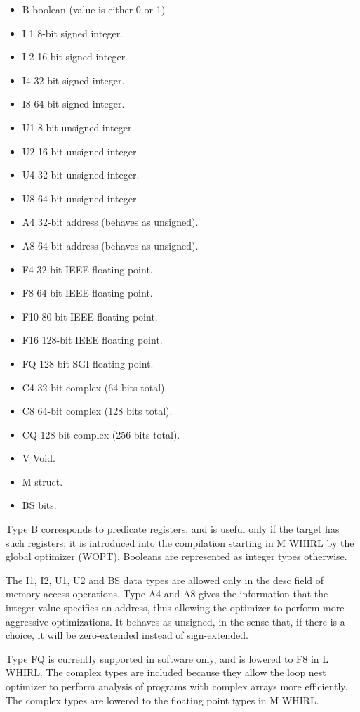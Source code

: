 \begin{itemize}
\item B boolean (value is either 0 or 1) 
\item I 1 8-bit signed integer. 
\item I 2 16-bit signed integer.
\item I4 32-bit signed integer. 
\item I8 64-bit signed integer.
\item U1 8-bit unsigned integer. 
\item U2 16-bit unsigned integer. 
\item U4 32-bit unsigned integer. 
\item U8 64-bit unsigned integer. 
\item A4 32-bit address (behaves as unsigned). 
\item A8 64-bit address (behaves as unsigned).
\item F4 32-bit IEEE floating point. 
\item F8 64-bit IEEE floating point. 
\item F10 80-bit IEEE floating point. 
\item F16 128-bit IEEE floating point.
\item FQ 128-bit SGI floating point.
\item C4 32-bit complex (64 bits total). 
\item C8 64-bit complex (128 bits total). 
\item CQ 128-bit complex (256 bits total).
\item V Void. 
\item M struct. 
\item BS bits.
\end{itemize}

Type B corresponds to predicate registers, and is useful only if
the target has such registers; it is introduced into the compilation
starting in M WHIRL by the global optimizer (WOPT). Booleans are
represented as integer types otherwise.

The I1, I2, U1, U2 and BS data types are allowed only in the desc
field of memory access operations. Type A4 and A8 gives the information
that the integer value specifies an address, thus allowing the
optimizer to perform more aggressive optimizations. It behaves as
unsigned, in the sense that, if there is a choice, it will be
zero-extended instead of sign-extended.

Type FQ is currently supported in software only, and is lowered to
F8 in L WHIRL. The complex types are included because they allow
the loop nest optimizer to perform analysis of programs with complex
arrays more efficiently. The complex types are lowered to the floating
point types in M WHIRL.

